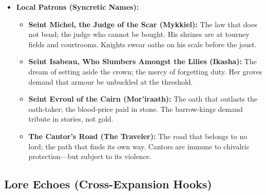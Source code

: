 \begin{itemize}
  \begin{itemize}
    \item \textbf{Armor Closes [6]} advances when knights choose protection over mercy, when gorgets are buckled tight, when chivalry becomes siege mentality. When full, the cantons close their borders and the raids become wars. The Fenwoods taught Vhasia that mercy is a weakness. The knights have not forgotten. They wear their gorgets to bed.
    \item \textbf{Song Escapes [8]} advances when a Cantor sings the truth, when mercy is shown, when armour is unbuckled. When full, a moment of genuine connection occurs---though it may be fatal. The Cantor Alain has been trying to fill this timer for ten years. He is still trying. He sings every dusk. The dead listen---and sometimes they answer.
  \end{itemize}
\item \textbf{Local Patrons (Syncretic Names):}
  \begin{itemize}
    \item \textbf{Seint Michel, the Judge of the Scar (Mykkiel):} The law that does not bend; the judge who cannot be bought. His shrines are at tourney fields and courtrooms. Knights swear oaths on his scale before the joust.
    \item \textbf{Seint Isabeau, Who Slumbers Amongst the Lilies (Ikasha):} The dream of setting aside the crown; the mercy of forgetting duty. Her groves demand that armour be unbuckled at the threshold.
    \item \textbf{Seint Evroul of the Cairn (Mor'iraath):} The oath that outlasts the oath-taker; the blood-price paid in stone. The barrow-kings demand tribute in stories, not gold.
    \item \textbf{The Cantor's Road (The Traveler):} The road that belongs to no lord; the path that finds its own way. Cantors are immune to chivalric protection---but subject to its violence.
  \end{itemize}
\end{itemize}

\subsection*{Lore Echoes (Cross-Expansion Hooks)}
\label{sec:vhasia-lore}

